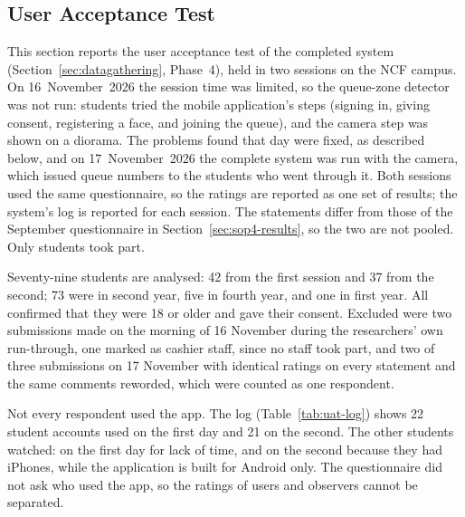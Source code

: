 \documentclass{research}
\begin{document}
\subsection{User Acceptance Test}
\label{sec:uat-results}

This section reports the user acceptance test of the completed system
(Section~\ref{sec:datagathering}, Phase~4), held in two sessions on the
NCF campus. On 16~November~2026 the session time was limited, so the
queue-zone detector was not run: students tried the mobile application's
steps (signing in, giving consent, registering a face, and joining the
queue), and the camera step was shown on a diorama. The problems found
that day were fixed, as described below, and on
17~November~2026 the complete system was run with the camera, which
issued queue numbers to the students who went through it. Both sessions
used the same questionnaire, so the ratings are reported as one set of
results; the system's log is reported for each session. The statements
differ from those of the September questionnaire in
Section~\ref{sec:sop4-results}, so the two are not pooled. Only students
took part.

\label{subsec:uat-log}

Seventy-nine students are analysed: 42 from the first session and 37
from the second; 73 were in second year, five in fourth year, and one in
first year. All confirmed that they were 18 or older and gave their
consent. Excluded were two submissions made on the morning of 16
November during the researchers' own run-through, one marked as cashier
staff, since no staff took part, and two of three submissions on 17
November with identical ratings on every statement and the same
comments reworded, which were counted as one respondent.

Not every respondent used the app. The log
(Table~\ref{tab:uat-log}) shows 22 student accounts used on the first day
and 21 on the second. The other students watched: on the first day for
lack of time, and on the second because they had iPhones, while the
application is built for Android only. The questionnaire did not ask who
used the app, so the ratings of users and observers cannot be separated.
\end{document}
